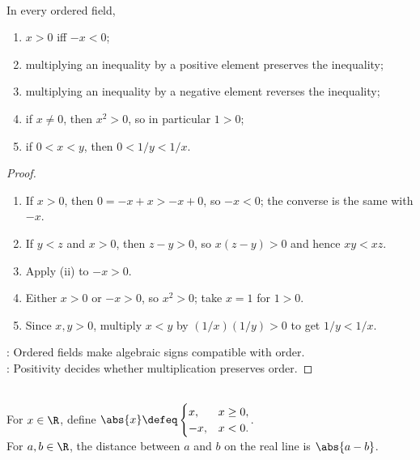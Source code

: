 \begin{proposition} \label{prop:ordered-field-inequality-rules-analysis} \\
In every ordered field,
\begin{enumerate}[label=(\roman*)]
\setlength{\itemsep}{0pt}
\item $x>0$ iff $-x<0$;
\item multiplying an inequality by a positive element preserves the inequality;
\item multiplying an inequality by a negative element reverses the inequality;
\item if $x\neq0$, then $x^2>0$, so in particular $1>0$;
\item if $0<x<y$, then $0<1/y<1/x$.
\end{enumerate}
\begin{proof}
\begin{enumerate}[label=(\roman*)]
\setlength{\itemsep}{0pt}
\item If $x>0$, then $0=-x+x>-x+0$, so $-x<0$; the converse is the same with $-x$.
\item If $y<z$ and $x>0$, then $z-y>0$, so $x(z-y)>0$ and hence $xy<xz$.
\item Apply (ii) to $-x>0$.
\item Either $x>0$ or $-x>0$, so $x^2>0$; take $x=1$ for $1>0$.
\item Since $x,y>0$, multiply $x<y$ by $(1/x)(1/y)>0$ to get $1/y<1/x$.
\end{enumerate}
: Ordered fields make algebraic signs compatible with order.\\
: Positivity decides whether multiplication preserves order.
\end{proof}
\end{proposition}

\begin{definition} \label{def:real-absolute-value-and-distance} \\
For $x\in\R$, define $\abs{x}\defeq
\begin{cases}
x, & x\geq0,\\
-x, & x<0.
\end{cases}$.\\
For $a,b\in\R$, the distance between $a$ and $b$ on the real line is $\abs{a-b}$.
\end{definition}

